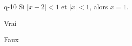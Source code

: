 \begin{truefalse}{q-10}
Si $|x-2|< 1$ et $|x|<1$, alors $x=1$.
\item Vrai
\item* Faux
\end{truefalse}

